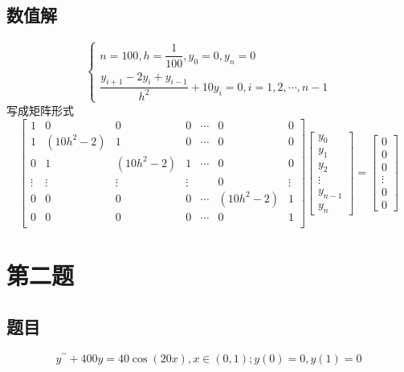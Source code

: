\documentclass{ctexart}
\numberwithin{equation}{section}
\begin{document}
\subsection{数值解}
\begin{equation}
    \left\{
        \begin{array}{l}
            n = 100,h=\dfrac{1}{100},y_0=0,y_n=0\\
            \dfrac{y_{i+1}-2y_{i}+y_{i-1}}{h^2}+10y_i=0,i = 1,2,\cdots,n-1
        \end{array}
            \right.
\end{equation}
写成矩阵形式
\begin{equation}
    \begin{bmatrix}
        1 & 0 & 0 & 0 & \cdots & 0 & 0\\
        1 & (10h^2-2) & 1 & 0 & \cdots & 0 & 0\\
        0 & 1 & (10h^2-2) & 1 & \cdots & 0 & 0\\
        \vdots & \vdots & \vdots & \vdots &  & 0 & \vdots\\
        0 & 0 & 0 & 0 & \cdots & (10h^2-2) & 1\\
        0 & 0 & 0 & 0 & \cdots & 0 & 1\\
    \end{bmatrix}
    \begin{bmatrix}
        y_0\\
        y_1\\
        y_2\\
        \vdots\\
        y_{n-1}\\
        y_n
    \end{bmatrix}
    =
    \begin{bmatrix}
        0\\
        0\\
        0\\
        \vdots\\
        0\\
        0
    \end{bmatrix}
\end{equation}
\section{第二题}
\subsection{题目}
\[y^{\prime \prime}+400 y=40 \cos (20 x), x \in(0,1) ; y(0)=0, y(1)=0\]
\end{document}

